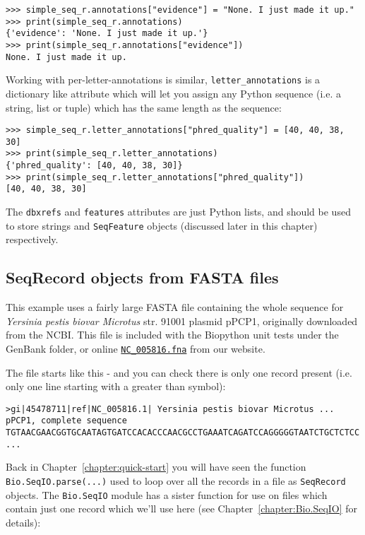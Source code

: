 \begin{verbatim}
>>> simple_seq_r.annotations["evidence"] = "None. I just made it up."
>>> print(simple_seq_r.annotations)
{'evidence': 'None. I just made it up.'}
>>> print(simple_seq_r.annotations["evidence"])
None. I just made it up.
\end{verbatim}

Working with per-letter-annotations is similar, \verb|letter_annotations| is a
dictionary like attribute which will let you assign any Python sequence (i.e.
a string, list or tuple) which has the same length as the sequence:

\begin{verbatim}
>>> simple_seq_r.letter_annotations["phred_quality"] = [40, 40, 38, 30]
>>> print(simple_seq_r.letter_annotations)
{'phred_quality': [40, 40, 38, 30]}
>>> print(simple_seq_r.letter_annotations["phred_quality"])
[40, 40, 38, 30]
\end{verbatim}

The \verb|dbxrefs| and \verb|features| attributes are just Python lists, and
should be used to store strings and \verb|SeqFeature| objects (discussed later
in this chapter) respectively.


\subsection{SeqRecord objects from FASTA files}

This example uses a fairly large FASTA file containing the whole sequence for \textit{Yersinia pestis biovar Microtus} str. 91001 plasmid pPCP1, originally downloaded from the NCBI.  This file is included with the Biopython unit tests under the GenBank folder, or online \href{http://biopython.org/SRC/biopython/Tests/GenBank/NC_005816.fna}{\texttt{NC\_005816.fna}} from our website.

The file starts like this - and you can check there is only one record present (i.e. only one line starting with a greater than symbol):

\begin{verbatim}
>gi|45478711|ref|NC_005816.1| Yersinia pestis biovar Microtus ... pPCP1, complete sequence
TGTAACGAACGGTGCAATAGTGATCCACACCCAACGCCTGAAATCAGATCCAGGGGGTAATCTGCTCTCC
...
\end{verbatim}

Back in Chapter~\ref{chapter:quick-start} you will have seen the function \verb|Bio.SeqIO.parse(...)|
used to loop over all the records in a file as \verb|SeqRecord| objects. The \verb|Bio.SeqIO| module
has a sister function for use on files which contain just one record which we'll use here (see Chapter~\ref{chapter:Bio.SeqIO} for details):


